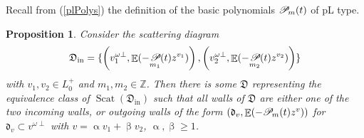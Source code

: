 \documentclass{amsart}
\DeclareMathOperator{\pl}{\mathscr{P}\!}
\DeclareMathOperator{\In}{in}
\DeclareMathOperator{\EE}{\mathbb{E}}
\DeclareMathOperator{\scat}{Scat}
\def\!{\mskip-\thinmuskip}
\let\f=\mathfrak
\renewcommand{\alpha}{\upalpha}
\renewcommand{\beta}{\upbeta}
\theoremstyle{plain}%
\newtheorem{prop}[thm]{Proposition}
\theoremstyle{definition}
\theoremstyle{remark}
\begin{document}
Recall from (\ref{plPolys}) the definition of the basic polynomials $\pl_m(t)$ of pL type. 

\begin{prop}\label{2WallpL}
Consider the scattering diagram
\begin{align}
    \f{D}_{\In}=\{\left(v_1^{\omega\perp},\EE(-\!\pl_{m_1}(t)z^{v_1})\right), \left(v_2^{\omega\perp},\EE(-\!\pl_{m_2}(t)z^{v_2})\right)\}
\end{align}
with $v_1,v_2\in L_0^+$ and $m_1,m_2\in\mathbb{Z}$.   Then there is some $\f{D}$ representing the equivalence class of $\scat(\f{D}_{\In})$ such that all walls of $\f{D}$ are either one of the two incoming walls, or outgoing walls of the form $(\f{d}_{v},\EE(-\!\pl_m(t)z^v))$ for $\f{d}_v\subset v^{\omega\perp}$ with $v=\alpha v_1+\beta v_2$, $\alpha,\beta\geq 1$.
\end{prop}
\end{document}
